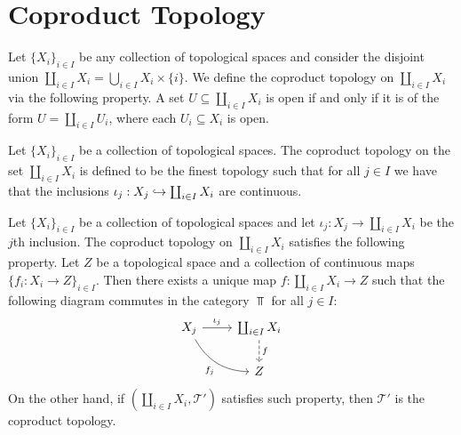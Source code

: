 \section{Coproduct Topology}

\begin{definition}
  Let \(\{X_i\}_{i \in I}\) be any collection of topological spaces and consider
  the disjoint union \(\coprod_{i \in I} X_i = \bigcup_{i \in  I} X_i \times
  \{i\}\). We define the coproduct topology on \(\coprod_{i \in I} X_i\) via the
  following property. A set \(U \subseteq \coprod_{i \in I} X_i\) is open if and
  only if it is of the form \(U = \coprod_{i \in I} U_i\), where each \(U_i
  \subseteq X_i\) is open.
\end{definition}

\begin{definition}\label{def: coproduct top}
  Let \(\{X_i\}_{i \in I}\) be a collection of topological spaces. The coproduct
  topology on the set \(\coprod_{i \in I} X_i\) is defined to be the finest
  topology such that for all \(j \in I\) we have that the inclusions \(\iota_j:
  X_j \hookrightarrow \coprod_{i \in I} X_i\) are continuous.
\end{definition}

\begin{theorem}
  \label{thm: coprod top universal property}
  Let \(\{X_i\}_{i \in I}\) be a collection of topological spaces and let
  \(\iota_j: X_j \to \coprod_{i \in I} X_i\) be the \(j\)th inclusion. The
  coproduct topology on \(\coprod_{i \in I} X_i\) satisfies the following
  property. Let \(Z\) be a topological space and a collection of continuous maps
  \(\{f_i: X_i \to Z\}_{i \in I}\). Then there exists a unique map \(f:
  \coprod_{i \in I} X_i \to Z\) such that the following diagram commutes in the
  category \(\Top\) for all \(j \in I\):
  \[
    \begin{tikzcd}
      X_j \ar[r, "\iota_j"]  \ar[rd, swap, bend right, "f_j"]
      & \coprod_{i \in I} X_i \ar[d, dashed, "f"] \\ &Z
    \end{tikzcd}
  \]
  On the other hand, if \((\coprod_{i \in I} X_i, \mathcal T')\) satisfies such
  property, then \(\mathcal T'\) is the coproduct topology.
\end{theorem}

